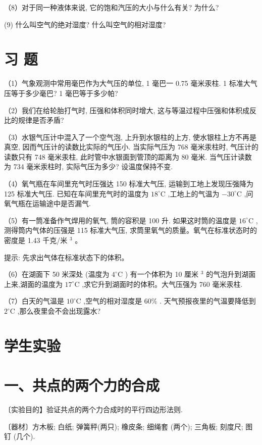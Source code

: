 \documentclass[10pt]{article}
\begin{document}
（8）对于同一种液体来说, 它的饱和汽压的大小与什么有关? 为什么?

(9) 什么叫空气的绝对湿度? 什么叫空气的相对湿度?

\section*{习 题}

（1）气象观测中常用毫巴作为大气压的单位, 1 毫巴一 0.75 毫米汞柱. 1 标准大气压等于多少毫巴? 1 毫巴等于多少帕?

（2）我们在给轮胎打气时, 压强和体积同时增大, 这与等温过程中压强和体积成反比的规律是否矛盾?

（3）水银气压计中混入了一个空气泡, 上升到水银柱的上方, 使水银柱上方不再是真空, 因而气压计的读数比实际的气压小. 当实际气压为 768 毫米汞柱时, 气压计的读数只有 748 毫米汞柱, 此时管中水银面到管顶的距离为 80 毫米. 当气压计读数为 734 毫米汞柱时, 实际气压为多少? 设温度保持不变.

（4）氧气瓶在车间里充气时压强达 150 标准大气压, 运输到工地上发现压强降为 125 标准大气压. 已知在车间里充气时的温度为 \({18}^{ \circ }\mathrm{C}\) ,工地上的气温为 \(- {30}^{ \circ }\mathrm{C}\) ,问氧气瓶在运输途中是否漏气.

（5）有一筒准备作气焊用的氧气, 筒的容积是 100 升. 如果这时筒的温度是 \({16}^{ \circ }\mathrm{C}\) ,测得筒内气体的压强是 115 标准大气压, 求筒里氧气的质量。氧气在标准状态时的密度是 1.43 千克/米 \({}^{3}\) 。

提示: 先求出气体在标准状态下的体积。

（6）在湖面下 50 米深处 (温度为 \({4}^{ \circ }\mathrm{C}\) ) 有一个体积为 10 厘米 \({}^{3}\) 的气泡升到湖面上来,湖面的温度为 \({17}^{ \circ }\mathrm{C}\) ,求它升到湖面时的体积。大气压强为 760 毫米汞柱.

（7）白天的气温是 \({10}^{ \circ }\mathrm{C}\) ,空气的相对湿度是 \({60}\%\) . 天气预报夜里的气温要降低到 \({2}^{ \circ }\mathrm{C}\) ,那么夜里会不会出现露水?

\section*{学生实验}

\section*{一、共点的两个力的合成}

〔实验目的】验证共点的两个力合成时的平行四边形法则.

〔器材〕方木板; 白纸; 弹簧秤(两只); 橡皮条; 细绳套 (两个); 三角板; 刻度尺; 图钉 (几个).
\end{document}
